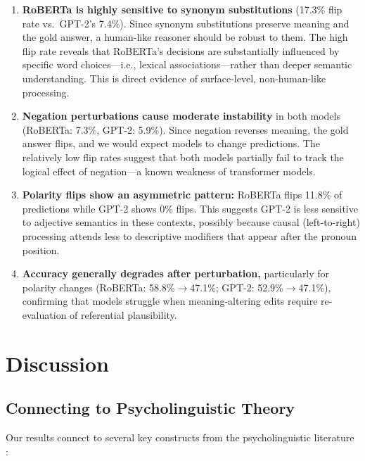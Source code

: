 \documentclass[11pt]{article}
\begin{document}
\begin{enumerate}[leftmargin=*]
    \item \textbf{RoBERTa is highly sensitive to synonym substitutions} (17.3\% flip rate vs.\ GPT-2's 7.4\%). Since synonym substitutions preserve meaning and the gold answer, a human-like reasoner should be robust to them. The high flip rate reveals that RoBERTa's decisions are substantially influenced by specific word choices---i.e., lexical associations---rather than deeper semantic understanding. This is direct evidence of surface-level, non-human-like processing.

    \item \textbf{Negation perturbations cause moderate instability} in both models (RoBERTa: 7.3\%, GPT-2: 5.9\%). Since negation reverses meaning, the gold answer flips, and we would expect models to change predictions. The relatively low flip rates suggest that both models partially fail to track the logical effect of negation---a known weakness of transformer models.

    \item \textbf{Polarity flips show an asymmetric pattern:} RoBERTa flips 11.8\% of predictions while GPT-2 shows 0\% flips. This suggests GPT-2 is less sensitive to adjective semantics in these contexts, possibly because causal (left-to-right) processing attends less to descriptive modifiers that appear after the pronoun position.

    \item \textbf{Accuracy generally degrades after perturbation,} particularly for polarity changes (RoBERTa: 58.8\%$\to$47.1\%; GPT-2: 52.9\%$\to$47.1\%), confirming that models struggle when meaning-altering edits require re-evaluation of referential plausibility.
\end{enumerate}

\section{Discussion}

\subsection{Connecting to Psycholinguistic Theory}

Our results connect to several key constructs from the psycholinguistic literature \citep{traxler2012}:
\end{document}
